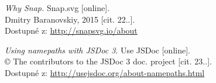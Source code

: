 \begin{flushleft}
\begin{thebibliography}{99}
			{\it Why Snap.} Snap.svg [online].\\
			Dmitry Baranovskiy, 2015 [cit. 22..].\\
			Dostupné z: \url{http://snapsvg.io/about}
			
			{\it Using namepaths with JSDoc 3}. Use JSDoc [online].\\
			© The contributors to the JSDoc 3 doc. project [cit. 23..].\\
			Dostupné z: \url{http://usejsdoc.org/about-namepaths.html}
		
			
	\end{thebibliography}
\end{flushleft}
